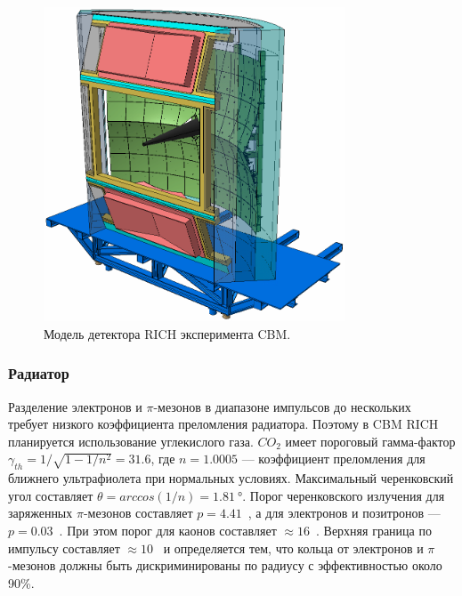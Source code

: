 \begin{figure}[H]
\centering
\includegraphics[width=0.8\textwidth]{pictures/CBM_RICH_2.png}
\caption{Модель детектора RICH эксперимента CBM.}
\label{fig:RICHconstruction}
\end{figure}

%                                         

\subsubsection{Радиатор}\label{sec:CbmRichRadiator}


Разделение электронов и $\pi$-мезонов в диапазоне импульсов до нескольких~\GeVoverC{} требует низкого коэффициента преломления радиатора. Поэтому в CBM RICH планируется использование углекислого газа.
$CO_{2}$ имеет пороговый гамма-фактор $\gamma _{th} = 1 / \sqrt{1 - 1/n^{2}} = 31.6$, где $n = 1.0005$ --- коэффициент преломления для ближнего ультрафиолета при нормальных условиях. Максимальный черенковский угол составляет $\theta = arccos(1/n) = \SI{1.81}{\degree}$. Порог черенковского излучения для заряженных $\pi$-мезонов составляет $p = 4.41$~\GeVoverC{}, а для электронов и позитронов --- $p = 0.03$~\GeVoverC{}. При этом порог для каонов составляет $\approx 16$~\GeVoverC{}. Верхняя граница по импульсу составляет $\approx 10$~\GeVoverC{} и определяется тем, что кольца от электронов и $\pi$-мезонов должны быть дискриминированы по радиусу с эффективностью около 90\%.

